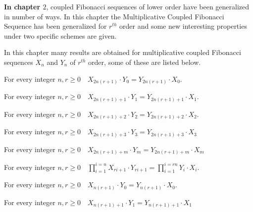 \begin{large}
\noindent \textbf{In chapter $2$}, coupled Fibonacci sequences of lower order have been generalized in number of ways. In this chapter the Multiplicative Coupled Fibonacci Sequence has been generalized for $r^{th}$  order and some new interesting properties under two specific schemes are given.

\noindent In this chapter many results are obtained for multiplicative coupled Fibonacci  sequences $X_{n}$ and $Y_{n}$ of $r^{th}$  order, some of these are listed below.
\begin{theorem}For every integer $n, r\geq0 \quad X_{2n(r+1)}\cdot Y_{0}=Y_{2n(r+1)}\cdot X_{0}.$
\end{theorem}\vspace{-0.3cm}
\begin{theorem} For every integer $n, r\geq0 \quad X_{2n(r+1)+1}\cdot Y_{1}=Y_{2n(r+1)+1}\cdot X_{1}.$
\end{theorem}\vspace{-0.3cm}
\begin{theorem} For every integer $n, r\geq0 \quad
X_{2n(r+1)+2}\cdot Y_{2}=Y_{2n(r+1)+2}\cdot X_{2}.
$
\end{theorem}\vspace{-0.3cm}
\begin{theorem} For every integer $n, r\geq0 \quad
X_{2n(r+1)+3}\cdot Y_{3}=Y_{2n(r+1)+3}\cdot X_{3}
$
\end{theorem}\vspace{-0.3cm}
\begin{theorem} For every integer $n, r\geq0 \quad
X_{2n(r+1)+m}\cdot Y_{m}=Y_{2n(r+1)+m}\cdot X_{m}
$
\end{theorem}\vspace{-0.3cm}
\begin{theorem} For every integer $n, r\geq0 \quad
\displaystyle\prod_{i=1}^{i=n}X_{ri+1}\cdot Y_{ri+1}=\displaystyle\prod_{i=1}^{i=rn}Y_{i}\cdot X_{i}.
$
\end{theorem}\vspace{-0.3cm}
\begin{theorem} For every integer $n, r\geq0 \quad
X_{n(r+1)}\cdot Y_{0}=Y_{n(r+1)}\cdot X_{0}.
$
\end{theorem}\vspace{-0.3cm}
\begin{theorem} For every integer $n, r\geq0 \quad
X_{n(r+1)+1}\cdot Y_{1}=Y_{n(r+1)+1}\cdot X_{1}
$
\end{theorem}\vspace{-0.3cm}
\end{large}
